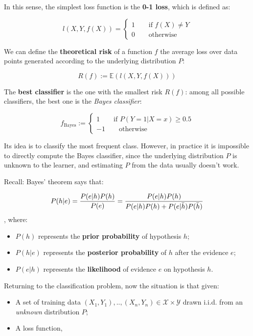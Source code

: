 In this sense, the simplest loss function is the \textbf{0-1 loss}, which is defined as:

$$
l(X,Y,f(X)) = \begin{cases}
    1 \qquad \text{if } f(X) \neq Y \\
    0 \qquad \text{otherwise}
\end{cases}
$$

We can define the \textbf{theoretical risk} of a function $f$ the average loss over data points generated according to the underlying distribution $P$:

$$
R(f) := \mathbb{E}(l(X,Y,f(X)))
$$

The \textbf{best classifier} is the one with the smallest risk $R(f)$: among all possible classifiers, the best one is the \textit{Bayes classifier}:

$$
f_{\text{Bayes}} := \begin{cases}
    1 \qquad \text{if } P(Y = 1 | X = x) \geq 0.5 \\
    -1 \qquad \text{otherwise}
\end{cases}
$$

Its idea is to classify the most frequent class. However, in practice it is impossible to directly compute the Bayes classifier, since the underlying distribution $P$ is unknown to the learner, and estimating $P$ from the data usually doesn't work.

Recall: Bayes' theorem says that:

$$
P(h|e) = \frac{P(e|h) P(h)}{P(e)} = \frac{P(e|h) P(h)}{P(e|h) P(h) + P(e|\Bar{h}) P(\Bar{h})}
$$
, where:

\begin{itemize}
    \item $P(h)$ represents the \textbf{prior probability} of hypothesis $h$;
    \item $P(h|e)$ represents the \textbf{posterior probability} of $h$ after the evidence $e$;
    \item $P(e|h)$ represents the \textbf{likelihood} of evidence $e$ on hypothesis $h$.
\end{itemize}

Returning to the classification problem, now the situation is that given:

\begin{itemize}
    \item A set of training data $(X_1, Y_1), .., (X_n, Y_n) \in \mathcal{X} \times \mathcal{Y}$ drawn i.i.d. from an \textit{unknown} distribution $P$;
    \item A loss function,
\end{itemize}


